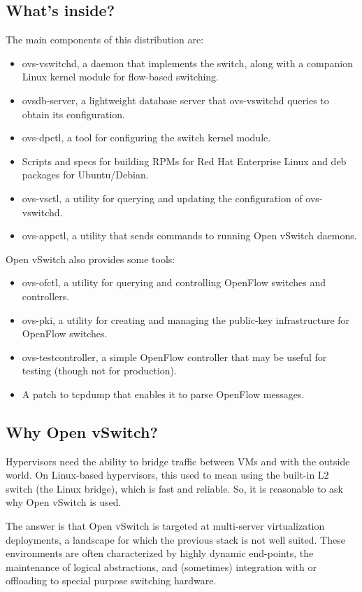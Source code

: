 \documentclass[../sn.tex]{subfiles}
\begin{document}
\subsection{What's inside?}
The main components of this distribution are:

\begin{itemize}
    \item ovs-vswitchd, a daemon that implements the switch, along with a companion 
    Linux kernel module for flow-based switching.
    \item ovsdb-server, a lightweight database server that ovs-vswitchd queries to 
    obtain its configuration.
    \item ovs-dpctl, a tool for configuring the switch kernel module.
    \item Scripts and specs for building RPMs for Red Hat Enterprise Linux and deb 
    packages for Ubuntu/Debian.
    \item ovs-vsctl, a utility for querying and updating the configuration of ovs-vswitchd.
    \item ovs-appctl, a utility that sends commands to running Open vSwitch daemons.
\end{itemize}Open vSwitch also provides some tools:
\begin{itemize}
    \item ovs-ofctl, a utility for querying and controlling OpenFlow switches and controllers.
    \item ovs-pki, a utility for creating and managing the public-key infrastructure for 
    OpenFlow switches.
    \item ovs-testcontroller, a simple OpenFlow controller that may be useful for 
    testing (though not for production).
    \item A patch to tcpdump that enables it to parse OpenFlow messages.
\end{itemize}

\subsection{Why Open vSwitch?}
Hypervisors need the ability to bridge traffic between VMs and with the outside world. On 
Linux-based hypervisors, this used to mean using the built-in L2 switch (the Linux bridge), 
which is fast and reliable. So, it is reasonable to ask why Open vSwitch is used.

The answer is that Open vSwitch is targeted at multi-server virtualization deployments, a 
landscape for which the previous stack is not well suited. These environments are often 
characterized by highly dynamic end-points, the maintenance of logical abstractions, and 
(sometimes) integration with or offloading to special purpose switching hardware.
\end{document}
